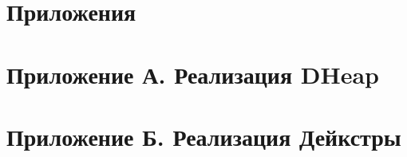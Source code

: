 \section*{Приложения}
\section*{Приложение А. Реализация DHeap}


\section*{Приложение Б. Реализация Дейкстры}


